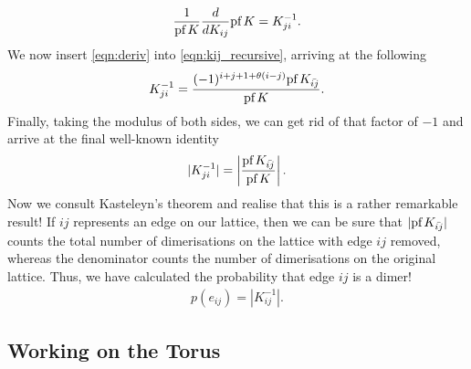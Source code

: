 \documentclass[11pt, oneside]{article} %
\numberwithin{equation}{section}
\begin{document}
\begin{align} \label{eqn:kij_inv}
    \frac{1}{\textup{pf}\, K} \frac d {dK_{ij}} \textup{pf}\, K = K^{-1}_{ji}.
\end{align}
We now insert \cref{eqn:deriv} into \cref{eqn:kij_recursive}, arriving at the following
\begin{align}\label{eqn:kij_in_k}
    K^{-1}_{ji} = \frac{
        (-1)^{i+j+1+\theta(i-j)} 
        \textup{pf}\,{K_{\bar {ij}}}
    } {
        \textup{pf}\, K
    }.
\end{align}
Finally, taking the modulus of both sides, we can get rid of that factor of $-1$ and arrive at the final well-known identity 
\begin{align}
    |K^{-1}_{ji}| = \left | \frac{
        \textup{pf}\,{K_{\bar {ij}}}
    } {
        \textup{pf}\, K
    }\right |.
\end{align}
Now we consult Kasteleyn's theorem and realise that this is a rather remarkable result! If $ij$ represents an edge on our lattice, then we can be sure that $|\textup{pf}\,{K_{\bar {ij}}}|$ counts the total number of dimerisations on the lattice with edge $ij$ removed, whereas the denominator counts the number of dimerisations on the original lattice. Thus, we have calculated the probability that edge $ij$ is a dimer!
\begin{align}
    p(e_{ij}) = |K_{ij}^{-1}|.
\end{align}

\subsection{Working on the Torus}
\end{document}
